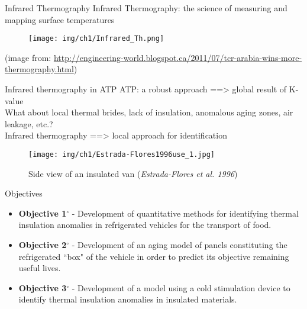 \begin{frame}{Infrared Thermography}
    \small{Infrared Thermography: the science of measuring and mapping surface temperatures}
    \pause
        \begin{figure}
            \texttt{[image: img/ch1/Infrared\_Th.png]}
        \end{figure}
        (\footnotesize{image from: \hyperlink{Engineering World}{http://engineering-world.blogspot.ca/2011/07/tcr-arabia-wins-more-thermography.html}})
\end{frame}



\begin{frame}{Infrared thermography in ATP}
\small
ATP: a robust approach ==> \alert{global} result of K-value\\
\pause
What about local thermal brides, lack of insulation, anomalous aging zones, air leakage, etc.?\\
\pause
Infrared thermography ==> \alert{local} approach for identification
\pause
    \begin{figure}
        \centering
        \texttt{[image: img/ch1/Estrada-Flores1996use\_1.jpg]}
        \caption{Side view of an insulated van (\textit{Estrada-Flores et al. 1996})}
    \end{figure}
\end{frame}


\begin{frame}{Objectives}
    \begin{itemize}
        \item \textbf{Objective 1$ ^\circ $ } - Development of quantitative methods for identifying thermal insulation anomalies in refrigerated vehicles for the transport of food.
        \item \textbf{Objective 2$ ^\circ $ } - Development of an aging model of panels constituting the refrigerated ``box" of the vehicle in order to predict its objective remaining useful lives. 
        \item \textbf{Objective 3$ ^\circ $ } - Development of a model using a cold stimulation device to identify thermal insulation anomalies in insulated materials.
    \end{itemize}
\end{frame}
